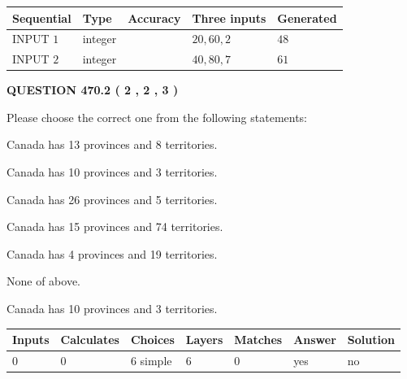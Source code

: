 \documentclass[12pt]{article}
\begin{document}
  
\noindent\begin{tabular}{|l|l|l|l|l|}
\hline
 Sequential & Type & Accuracy & Three inputs & Generated \\ 
\hline
 
 
  INPUT $  1 $ & integer &  & $
 20
 , 
 60
 , 
 2
 $ & $ 48 $ 
 \\  \hline  
 
 
  INPUT $  2 $ & integer &  & $
 40
 , 
 80
 , 
 7
 $ & $ 61 $ 
 \\  \hline  
 \end{tabular}
   
   
  
\vspace{0.2in}
  
{\textbf{\Large{QUESTION
470.2 
 ( 2 , 2 , 3 )
}}}
  
  
Please choose the correct one from the following statements:
 
 
Canada has  13 provinces and  8 territories.
 
 
Canada has 10  provinces and 3 territories.
 
 
Canada has  26 provinces and  5 territories.
 
 
Canada has  15 provinces and  74 territories.
 
 
Canada has   4 provinces and  19 territories.
 
 
 None of above.
 
 
\noindent{}
 
 
Canada has 10  provinces and 3 territories.
 
 
\noindent{}
 
 
   
   
   
   
\noindent\begin{tabular}{|l|l|l|l|l|l|l|}
 \hline
Inputs & Calculates & Choices & Layers & Matches & Answer & Solution \\ \hline
 0  & 
 0  & 
 6
  simple  
  & 
 6  & 
 0  & 
  yes & 
  no 
  \\ \hline
 \end{tabular}
   
\end{document}
